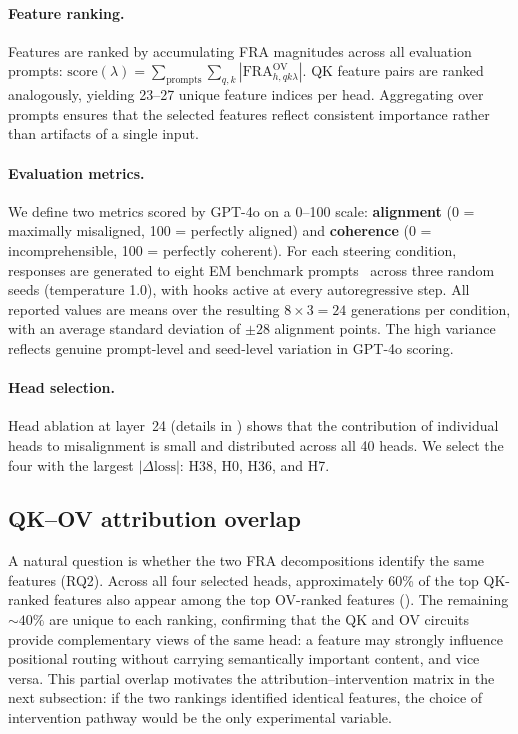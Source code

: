 \documentclass{article}
\theoremstyle{plain}
\theoremstyle{definition}
\theoremstyle{remark}
\begin{document}
\paragraph{Feature ranking.} Features are ranked by accumulating FRA magnitudes across all evaluation prompts: $\mathrm{score}(\lambda) = \sum_{\text{prompts}} \sum_{q,k} |\mathrm{FRA}^{\mathrm{OV}}_{h,qk\lambda}|$. QK feature pairs are ranked analogously, yielding 23--27 unique feature indices per head. Aggregating over prompts ensures that the selected features reflect consistent importance rather than artifacts of a single input.

\paragraph{Evaluation metrics.} We define two metrics scored by GPT-4o on a 0--100 scale: \textbf{alignment} (0 = maximally misaligned, 100 = perfectly aligned) and \textbf{coherence} (0 = incomprehensible, 100 = perfectly coherent). For each steering condition, responses are generated to eight EM benchmark prompts~\citep{emergent_misalignment} across three random seeds (temperature 1.0), with hooks active at every autoregressive step. All reported values are means over the resulting $8 \times 3 = 24$ generations per condition, with an average standard deviation of ${\pm}28$ alignment points. The high variance reflects genuine prompt-level and seed-level variation in GPT-4o scoring.

\paragraph{Head selection.} Head ablation at layer~24 (details in ) shows that the contribution of individual heads to misalignment is small and distributed across all 40 heads. We select the four with the largest $|\Delta\text{loss}|$: H38, H0, H36, and H7.

\subsection{QK--OV attribution overlap}
\label{sec:attribution_intervention}

A natural question is whether the two FRA decompositions identify the same features (RQ2). Across all four selected heads, approximately 60\% of the top QK-ranked features also appear among the top OV-ranked features (). The remaining ${\sim}40\%$ are unique to each ranking, confirming that the QK and OV circuits provide complementary views of the same head: a feature may strongly influence positional routing without carrying semantically important content, and vice versa. This partial overlap motivates the attribution--intervention matrix in the next subsection: if the two rankings identified identical features, the choice of intervention pathway would be the only experimental variable.
\end{document}

